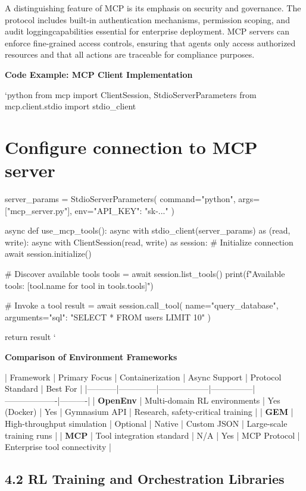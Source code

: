 A distinguishing feature of MCP is its emphasis on security and governance. The protocol includes built-in authentication mechanisms, permission scoping, and audit loggingcapabilities essential for enterprise deployment. MCP servers can enforce fine-grained access controls, ensuring that agents only access authorized resources and that all actions are traceable for compliance purposes.

\textbf{Code Example: MCP Client Implementation}

\texttt{}`python
from mcp import ClientSession, StdioServerParameters
from mcp.client.stdio import stdio_client

\section{Configure connection to MCP server}
server_params = StdioServerParameters(
    command="python",
    args=["mcp_server.py"],
    env={"API_KEY": "sk-..."}
)

async def use_mcp_tools():
    async with stdio_client(server_params) as (read, write):
        async with ClientSession(read, write) as session:
            # Initialize connection
            await session.initialize()
            
            # Discover available tools
            tools = await session.list_tools()
            print(f"Available tools: {[tool.name for tool in tools.tools]}")
            
            # Invoke a tool
            result = await session.call_tool(
                name="query_database",
                arguments={"sql": "SELECT * FROM users LIMIT 10"}
            )
            
            return result
\texttt{}`

\textbf{Comparison of Environment Frameworks}

| Framework | Primary Focus | Containerization | Async Support | Protocol Standard | Best For |
|-----------|--------------|------------------|---------------|-------------------|----------|
| \textbf{OpenEnv} | Multi-domain RL environments | Yes (Docker) | Yes | Gymnasium API | Research, safety-critical training |
| \textbf{GEM} | High-throughput simulation | Optional | Native | Custom JSON | Large-scale training runs |
| \textbf{MCP} | Tool integration standard | N/A | Yes | MCP Protocol | Enterprise tool connectivity |

\subsection{4.2 RL Training and Orchestration Libraries}

